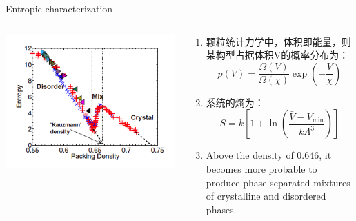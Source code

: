 \documentclass{bredelebeamer}
\begin{document}
\begin{frame}{Entropic characterization}
\begin{columns}
\begin{column}{0.5\textwidth}
\includegraphics[scale=0.3]{images/pp8.png}
\end{column}

\begin{column}{0.5\textwidth}
\begin{enumerate}[]
\item 颗粒统计力学中，体积即能量，则某构型占据体积V的概率分布为：
$$p(V)=\frac{\Omega(V)}{\Omega(\chi)} \exp \left(-\frac{V}{\chi}\right)$$
\item 系统的熵为：
$$S=k\left[1+\ln \left(\frac{\bar{V}-V_{\min }}{k \Lambda^{3}}\right)\right]$$
\item Above the density of 0.646, it becomes more probable to
produce phase-separated mixtures of crystalline and disordered
phases.
\end{enumerate}
\end{column}
\end{columns}
\end{frame}
\end{document}
